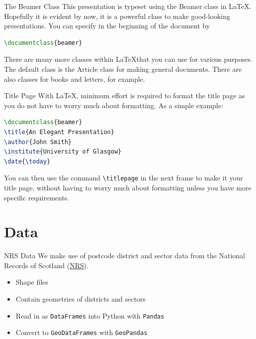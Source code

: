 \documentclass[hyperref={breaklinks,colorlinks,
   urlcolor=blue,citecolor=blue,linkcolor=red}]{beamer}
\newcommand{\Python}{{\sc Python}\xspace}
\begin{document}
\begin{frame}[fragile]{The Beamer Class}
This presentation is typeset using the Beamer
class in \LaTeX. Hopefully it is evident by now,
it is a powerful class to make good-looking presentations.
You can specify in the beginning of the document by
\begin{lstlisting}[language=TeX,frame=single]
\documentclass{beamer}
\end{lstlisting}

There are many more classes within \LaTeX that you can use
for various purposes. The default class is the Article
class for making general documents. There are
also classes for books and letters, for example.
\end{frame}

\begin{frame}[fragile]{Title Page}
With \LaTeX, minimum effort is required to
format the title page as you do not have to worry much about formatting.
As a simple example:
\begin{lstlisting}[language=TeX,frame=single]
\documentclass{beamer}
\title{An Elegant Presentation}
\author{John Smith}
\institute{University of Glasgow}
\date{\today}
\end{lstlisting}
You can then use the command \verb!\titlepage!
in the next frame to make it your title page,
without having to worry much about formatting unless you have
more specific requirements.
\end{frame}

\section{Data}
\begin{frame}{NRS Data}
We make use of postcode district
and sector data from the National Records of Scotland (\href{https://www.nrscotland.gov.uk/statistics-and-data/geography/nrs-postcode-extract}{NRS}).
\begin{itemize}
\item{Shape files}
\item{Contain geometries of districts and sectors}
\item{Read in as \texttt{DataFrames} into \Python with
\texttt{Pandas}}
\item{Convert to \texttt{GeoDataFrames} with \texttt{GeoPandas}}
\end{itemize}
\end{frame}
\end{document}
